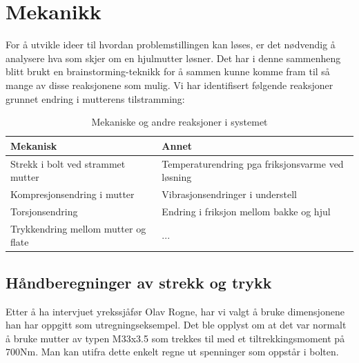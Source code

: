 \section{Mekanikk}

For å utvikle ideer til hvordan problemstillingen kan løses, er det nødvendig å analysere hva som skjer om en hjulmutter løsner. Det har i denne sammenheng blitt brukt en brainstorming-teknikk for å sammen kunne komme fram til så mange av disse reaksjonene som mulig. Vi har identifisert følgende reaksjoner grunnet endring i mutterens tilstramming:

\begin{table}[h]
\caption{Mekaniske og andre reaksjoner i systemet}
\begin{tabular}{|l|l|}
\hline
\textbf{Mekanisk}                   & \textbf{Annet}                                   \\
\hline
Strekk i bolt ved strammet mutter   & Temperaturendring pga friksjonsvarme ved løsning \\
\hline
Kompresjonsendring i mutter         & Vibrasjonsendringer i understell                 \\
\hline
Torsjonsendring                     & Endring i friksjon mellom bakke og hjul          \\
\hline
Trykkendring mellom mutter og flate & ...                                              \\
\hline
\end{tabular}
\end{table}

\subsection{Håndberegninger av strekk og trykk}

Etter å ha intervjuet yrekssjåfør Olav Rogne, har vi valgt å bruke dimensjonene han har oppgitt som utregningseksempel. Det ble opplyst om at det var normalt å bruke mutter av typen M33x3.5 som trekkes til med et tiltrekkingsmoment på 700Nm. Man kan utifra dette enkelt regne ut spenninger som oppstår i bolten.

